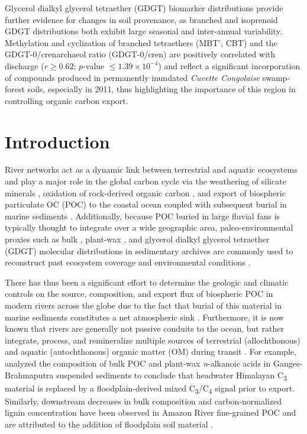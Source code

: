 Glycerol dialkyl glycerol tetraether (GDGT) biomarker distributions provide further evidence for changes in soil provenance, as branched and isoprenoid GDGT distributions both exhibit large seasonal and inter-annual variability. Methylation and cyclization of branched tetraethers (MBT', CBT) and the GDGT-0/crenarchaeol ratio (GDGT-0/cren) are positively correlated with discharge ($r \geq 0.62$; $p$-value $\leq 1.39 \times 10^{-4}$) and reflect a significant incorporation of compounds produced in permanently inundated \textit{Cuvette Congolaise} swamp-forest soils, especially in 2011, thus highlighting the importance of this region in controlling organic carbon export.

\section{Introduction}

River networks act as a dynamic link between terrestrial and aquatic ecosystems and play a major role in the global carbon cycle via the weathering of silicate minerals \citep{Berner:1983uk,Gaillardet:1999uy}, oxidation of rock-derived organic carbon \citep[OC\textsubscript{petro};][]{Galy:2008ff,Bouchez:2010if,Hilton:2014dh}, and export of biospheric particulate OC (POC) to the coastal ocean coupled with subsequent burial in marine sediments \citep{Berner:1982vg,Galy:2007ev}. Additionally, because POC buried in large fluvial fans is typically thought to integrate over a wide geographic area, paleo-environmental proxies such as bulk , plant-wax , and glycerol dialkyl glycerol tetraether (GDGT) molecular distributions in sedimentary archives are commonly used to reconstruct past ecosystem coverage and environmental conditions \citep[\textit{e.g.}][]{FranceLanord:1994vp,Freeman:2001tv,Schefuss:2005jo,Weijers:2007fp}.

There has thus been a significant effort to determine the geologic and climatic controls on the source, composition, and export flux of biospheric POC in modern rivers across the globe due to the fact that burial of this material in marine sediments constitutes a net atmospheric  sink \citep{Lasaga:1985ts,Ludwig:1996ul,Galy:2015fx}. Furthermore, it is now known that rivers are generally not passive conduits to the ocean, but rather integrate, process, and remineralize multiple sources of terrestrial (allochthonous) and aquatic (autochthonous) organic matter (OM) during transit \citep{Cole:2007gp,Aufdenkampe:2011fm}. For example, \citet{Galy:2008jw,Galy:2011ix} analyzed the  composition of bulk POC and plant-wax \textit{n}-alkanoic acids in Ganges-Brahmaputra suspended sediments to conclude that headwater Himalayan C\textsubscript{3} material is replaced by a floodplain-derived mixed C\textsubscript{3}/C\textsubscript{4} signal prior to export. Similarly, downstream decreases in bulk  composition and carbon-normalized lignin concentration have been observed in Amazon River fine-grained POC and are attributed to the addition of floodplain soil material \citep{Hedges:1986ab,Hedges:2000tn}.

